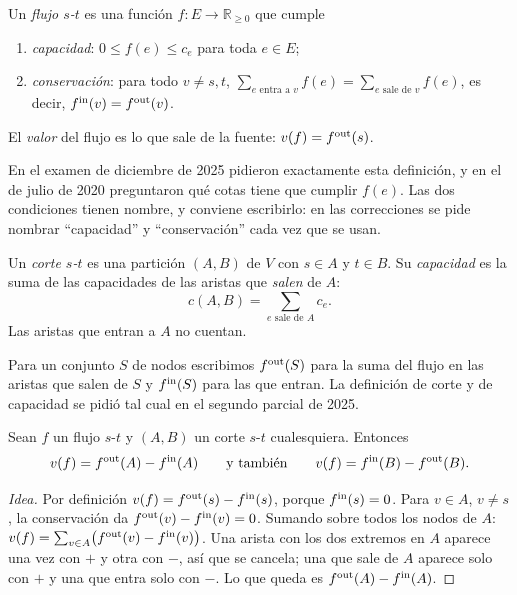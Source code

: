 \begin{definicion}
Un \emph{flujo $s$-$t$} es una función $f:E\to\mathbb{R}_{\ge 0}$ que cumple
\begin{enumerate}[label=(\roman*)]
  \item \emph{capacidad}: $0\le f(e)\le c_e$ para toda $e\in E$;
  \item \emph{conservación}: para todo $v\ne s,t$, $\displaystyle\sum_{e\text{ entra a }v} f(e)=\sum_{e\text{ sale de }v} f(e)$, es decir, $f^{\mathrm{in}}(v)=f^{\mathrm{out}}(v)$.
\end{enumerate}
El \emph{valor} del flujo es lo que sale de la fuente: $v(f)=f^{\mathrm{out}}(s)$.
\end{definicion}

En el examen de diciembre de 2025 pidieron exactamente esta definición, y en el de julio de 2020 preguntaron qué cotas tiene que cumplir $f(e)$. Las dos condiciones tienen nombre, y conviene escribirlo: en las correcciones se pide nombrar ``capacidad'' y ``conservación'' cada vez que se usan.

\begin{definicion}
Un \emph{corte $s$-$t$} es una partición $(A,B)$ de $V$ con $s\in A$ y $t\in B$. Su \emph{capacidad} es la suma de las capacidades de las aristas que \emph{salen} de $A$:
\[ c(A,B)=\sum_{e\text{ sale de }A} c_e . \]
Las aristas que entran a $A$ no cuentan.
\end{definicion}

Para un conjunto $S$ de nodos escribimos $f^{\mathrm{out}}(S)$ para la suma del flujo en las aristas que salen de $S$ y $f^{\mathrm{in}}(S)$ para las que entran. La definición de corte y de capacidad se pidió tal cual en el segundo parcial de 2025.

\begin{resultado}[(7.6) y (7.7)]
Sean $f$ un flujo $s$-$t$ y $(A,B)$ un corte $s$-$t$ cualesquiera. Entonces
\[ v(f)=f^{\mathrm{out}}(A)-f^{\mathrm{in}}(A) \qquad\text{y también}\qquad v(f)=f^{\mathrm{in}}(B)-f^{\mathrm{out}}(B). \]
\end{resultado}

\begin{proof}[Idea]
Por definición $v(f)=f^{\mathrm{out}}(s)-f^{\mathrm{in}}(s)$, porque $f^{\mathrm{in}}(s)=0$. Para $v\in A$, $v\neq s$, la conservación da $f^{\mathrm{out}}(v)-f^{\mathrm{in}}(v)=0$. Sumando sobre todos los nodos de $A$:
$v(f)=\sum_{v\in A}\bigl(f^{\mathrm{out}}(v)-f^{\mathrm{in}}(v)\bigr)$. Una arista con los dos extremos en $A$ aparece una vez con $+$ y otra con $-$, así que se cancela; una que sale de $A$ aparece solo con $+$ y una que entra solo con $-$. Lo que queda es $f^{\mathrm{out}}(A)-f^{\mathrm{in}}(A)$.
\end{proof}

